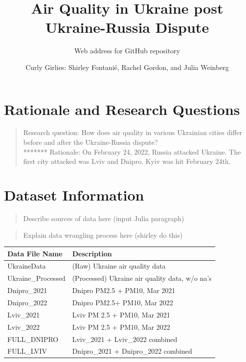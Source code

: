 \documentclass[
  12pt,
]{article}
\title{Air Quality in Ukraine post Ukraine-Russia Dispute}
\subtitle{Web address for GitHub repository}
\author{Curly Girlies: Shirley Fontanié, Rachel Gordon, and Julia
Weinberg}
\date{}
\begin{document}
\maketitle

\newpage
\tableofcontents 
\newpage
\listoftables 
\newpage
\listoffigures 
\newpage

\hypertarget{rationale-and-research-questions}{%
\section{Rationale and Research
Questions}\label{rationale-and-research-questions}}

\begin{quote}
Research question: How does air quality in various Ukrainian cities
differ before and after the Ukraine-Russia dispute?\\
******* Rationale: On February 24, 2022, Russia attacked Ukraine. The
first city attacked was Lviv and Dnipro. Kyiv was hit February 24th.
\end{quote}

\newpage

\hypertarget{dataset-information}{%
\section{Dataset Information}\label{dataset-information}}

\begin{quote}
Describe sources of data here (input Julia paragraph)
\end{quote}

\begin{quote}
Explain data wrangling process here (shirley do this)
\end{quote}

\begin{longtable}[]{@{}ll@{}}
\toprule
Data File Name & Description \\
\midrule
\endhead
UkraineData & (Raw) Ukraine air quality data \\
Ukraine\_Processed & (Processed) Ukraine air quality data, w/o na's \\
Dnipro\_2021 & Dnipro PM2.5 + PM10, Mar 2021 \\
Dnipro\_2022 & Dnipro PM2.5+ PM10, Mar 2022 \\
Lviv\_2021 & Lviv PM 2.5 + PM10, Mar 2021 \\
Lviv\_2022 & Lviv PM 2.5 + PM10, Mar 2022 \\
FULL\_DNIPRO & Lviv\_2021 + Lviv\_2022 combined \\
FULL\_LVIV & Dnipro\_2021 + Dnipro\_2022 combined \\
\bottomrule
\end{longtable}
\end{document}
